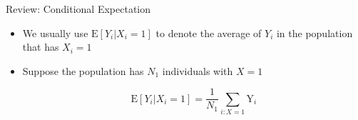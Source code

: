 \documentclass[hyperref={pdfpagelabels=false}]{beamer}
\begin{document}





\date
{}


\begin{frame}{}
	\titlepage
\end{frame}



\begin{frame}{Review: Conditional Expectation}
	\begin{itemize} 
		\item We usually use $\mathrm{E}[Y_{i}|X_{i}=1]$ to denote the average of $Y_{i}$ in the population that has $X_{i}=1$
		
		\item Suppose the population has $N_{1}$ individuals with $X=1$
		
		\begin{equation*}
		\mathrm{E}[Y_{i}|X_{i}=1] = \dfrac{1}{N_{1}} \sum_{i:X=1} \mathrm{Y}_{i}
		\end{equation*}
		
		
		\vspace{0.2cm}
	\end{itemize}
\end{frame}
\end{document}
